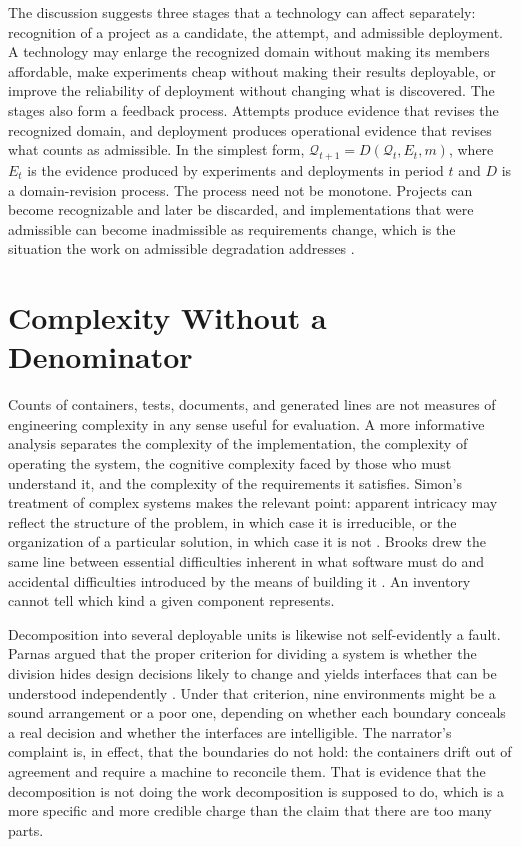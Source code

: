 \documentclass[11pt]{article}
\theoremstyle{remark}
\newcommand{\Q}{\mathcal{Q}}
\begin{document}
The discussion suggests three stages that a technology can affect separately: recognition of a project as a candidate, the attempt, and admissible deployment. A technology may enlarge the recognized domain without making its members affordable, make experiments cheap without making their results deployable, or improve the reliability of deployment without changing what is discovered. The stages also form a feedback process. Attempts produce evidence that revises the recognized domain, and deployment produces operational evidence that revises what counts as admissible. In the simplest form, $\Q_{t+1}=D(\Q_t,E_t,m)$, where $E_t$ is the evidence produced by experiments and deployments in period $t$ and $D$ is a domain-revision process. The process need not be monotone. Projects can become recognizable and later be discarded, and implementations that were admissible can become inadmissible as requirements change, which is the situation the work on admissible degradation addresses \cite{flyxion_degrade}.

\section{Complexity Without a Denominator}

Counts of containers, tests, documents, and generated lines are not measures of engineering complexity in any sense useful for evaluation. A more informative analysis separates the complexity of the implementation, the complexity of operating the system, the cognitive complexity faced by those who must understand it, and the complexity of the requirements it satisfies. Simon's treatment of complex systems makes the relevant point: apparent intricacy may reflect the structure of the problem, in which case it is irreducible, or the organization of a particular solution, in which case it is not \cite{simon1962}. Brooks drew the same line between essential difficulties inherent in what software must do and accidental difficulties introduced by the means of building it \cite{brooks1987}. An inventory cannot tell which kind a given component represents.

Decomposition into several deployable units is likewise not self-evidently a fault. Parnas argued that the proper criterion for dividing a system is whether the division hides design decisions likely to change and yields interfaces that can be understood independently \cite{parnas1972}. Under that criterion, nine environments might be a sound arrangement or a poor one, depending on whether each boundary conceals a real decision and whether the interfaces are intelligible. The narrator's complaint is, in effect, that the boundaries do not hold: the containers drift out of agreement and require a machine to reconcile them. That is evidence that the decomposition is not doing the work decomposition is supposed to do, which is a more specific and more credible charge than the claim that there are too many parts.
\end{document}
